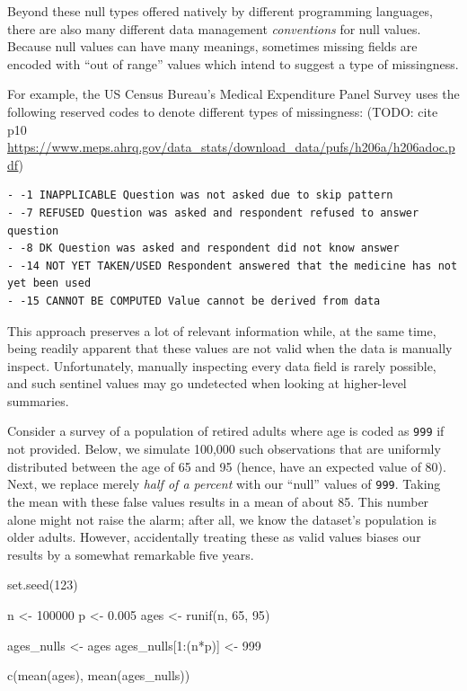 \documentclass[
]{krantz}
\makeatletter
\newenvironment{Shaded}{\begin{snugshade}}{\end{snugshade}}
\newcommand{\DecValTok}[1]{\textcolor[rgb]{0.06,0.06,0.06}{#1}}
\newcommand{\FloatTok}[1]{\textcolor[rgb]{0.06,0.06,0.06}{#1}}
\newcommand{\FunctionTok}[1]{\textcolor[rgb]{0,0,0}{#1}}
\newcommand{\NormalTok}[1]{#1}
\newcommand{\OtherTok}[1]{\textcolor[rgb]{0.37,0.37,0.37}{#1}}
\newcommand{\SpecialCharTok}[1]{\textcolor[rgb]{0,0,0}{#1}}
\newenvironment{kframe}{%
\medskip{}
\setlength{\fboxsep}{.8em}
 \def\at@end@of@kframe{}%
 \ifinner\ifhmode%
  \def\at@end@of@kframe{\end{minipage}}%
  \begin{minipage}{\columnwidth}%
 \fi\fi%
 \def\FrameCommand##1{\hskip\@totalleftmargin \hskip-\fboxsep
 \colorbox{shadecolor}{##1}\hskip-\fboxsep
     \hskip-\linewidth \hskip-\@totalleftmargin \hskip\columnwidth}%
 \MakeFramed {\advance\hsize-\width
   \@totalleftmargin\z@ \linewidth\hsize
   \@setminipage}}%
 {\par\unskip\endMakeFramed%
 \at@end@of@kframe}
\renewenvironment{Shaded}{\begin{kframe}}{\end{kframe}}
\makeatother
\begin{document}
Beyond these null types offered natively by different programming languages, there are also many different data management \emph{conventions} for null values. Because null values can have many meanings, sometimes missing fields are encoded with ``out of range'' values which intend to suggest a type of missingness.

For example, the US Census Bureau's Medical Expenditure Panel Survey uses the following reserved codes to denote different types of missingness: (TODO: cite p10 \url{https://www.meps.ahrq.gov/data_stats/download_data/pufs/h206a/h206adoc.pdf})

\begin{verbatim}
- -1 INAPPLICABLE Question was not asked due to skip pattern
- -7 REFUSED Question was asked and respondent refused to answer question
- -8 DK Question was asked and respondent did not know answer
- -14 NOT YET TAKEN/USED Respondent answered that the medicine has not yet been used
- -15 CANNOT BE COMPUTED Value cannot be derived from data
\end{verbatim}

This approach preserves a lot of relevant information while, at the same time, being readily apparent that these values are not valid when the data is manually inspect. Unfortunately, manually inspecting every data field is rarely possible, and such sentinel values may go undetected when looking at higher-level summaries.

Consider a survey of a population of retired adults where age is coded as \texttt{999} if not provided. Below, we simulate 100,000 such observations that are uniformly distributed between the age of 65 and 95 (hence, have an expected value of 80). Next, we replace merely \emph{half of a percent} with our ``null'' values of \texttt{999}. Taking the mean with these false values results in a mean of about 85. This number alone might not raise the alarm; after all, we know the dataset's population is older adults. However, accidentally treating these as valid values biases our results by a somewhat remarkable five years.

\begin{Shaded}
\begin{Highlighting}[]
\FunctionTok{set.seed}\NormalTok{(}\DecValTok{123}\NormalTok{)}

\NormalTok{n }\OtherTok{\textless{}{-}} \DecValTok{100000}
\NormalTok{p }\OtherTok{\textless{}{-}} \FloatTok{0.005}
\NormalTok{ages }\OtherTok{\textless{}{-}} \FunctionTok{runif}\NormalTok{(n, }\DecValTok{65}\NormalTok{, }\DecValTok{95}\NormalTok{)}

\NormalTok{ages\_nulls }\OtherTok{\textless{}{-}}\NormalTok{ ages}
\NormalTok{ages\_nulls[}\DecValTok{1}\SpecialCharTok{:}\NormalTok{(n}\SpecialCharTok{*}\NormalTok{p)] }\OtherTok{\textless{}{-}} \DecValTok{999}

\FunctionTok{c}\NormalTok{(}\FunctionTok{mean}\NormalTok{(ages), }\FunctionTok{mean}\NormalTok{(ages\_nulls))}
\end{Highlighting}
\end{Shaded}
\end{document}
